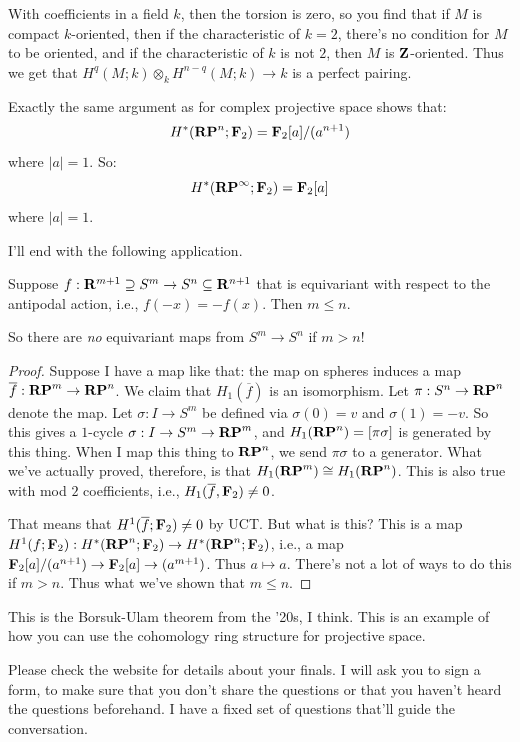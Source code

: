 With coefficients in a field $k$, then the torsion is zero, so you find that if $M$ is compact $k$-oriented, then if the characteristic of $k=2$, there's no condition for $M$ to be oriented, and if the characteristic of $k$ is not $2$, then $M$ is $\mathbf Z$-oriented. Thus we get that $H^q(M;k)\otimes_k H^{n-q}(M;k)\to k$ is a perfect pairing.
\begin{example}
Exactly the same argument as for complex projective space shows that:
\begin{equation*}
H^\ast(\mathbf{RP}^n;\mathbf F_2)=\mathbf F_2[a]/(a^{n+1})
\end{equation*}
where $|a|=1$. So:
\begin{equation}
H^\ast(\mathbf{RP}^\infty;\mathbf F_2)=\mathbf F_2[a]
\end{equation}
where $|a|=1$.
\end{example}
I'll end with the following application.
\begin{theorem}
Suppose $f:\mathbf R^{m+1}\supseteq S^m\to S^n\subseteq \mathbf R^{n+1}$ that is equivariant with respect to the antipodal action, i.e., $f(-x)=-f(x)$. Then $m\leq n$.
\end{theorem}
So there are \emph{no} equivariant maps from $S^m\to S^n$ if $m>n$!
\begin{proof}
Suppose I have a map like that: the map on spheres induces a map $\overline{f}:\mathbf{RP}^m\to\mathbf{RP}^n$. We claim that $H_1(\overline{f})$ is an isomorphism. Let $\pi:S^n\to\mathbf{RP}^n$ denote the map. Let $\sigma:I\to S^m$ be defined via $\sigma(0)=v$ and $\sigma(1)=-v$. So this gives a $1$-cycle $\sigma:I\to S^m\to\mathbf{RP}^m$, and $H_1(\mathbf{RP}^n)=[\pi\sigma]$ is generated by this thing. When I map this thing to $\mathbf{RP}^n$, we send $\pi\sigma$ to a generator. What we've actually proved, therefore, is that $H_1(\mathbf{RP}^m)\cong H_1(\mathbf{RP}^n)$. This is also true with mod $2$ coefficients, i.e., $H_1(\overline{f},\mathbf F_2)\neq 0$.

That means that $H^1(\overline{f};\mathbf F_2)\neq 0$ by UCT. But what is this? This is a map $H^1(f;\mathbf F_2):H^\ast(\mathbf{RP}^n;\mathbf F_2)\to H^\ast(\mathbf{RP}^n;\mathbf F_2)$, i.e., a map $\mathbf F_2[a]/(a^{n+1})\to \mathbf F_2[a]\to(a^{m+1})$. Thus $a\mapsto a$. There's not a lot of ways to do this if $m>n$. Thus what we've shown that $m\leq n$.
\end{proof}
This is the Borsuk-Ulam theorem from the '20s, I think. This is an example of how you can use the cohomology ring structure for projective space.

Please check the website for details about your finals. I will ask you to sign a form, to make sure that you don't share the questions or that you haven't heard the questions beforehand. I have a fixed set of questions that'll guide the conversation.
